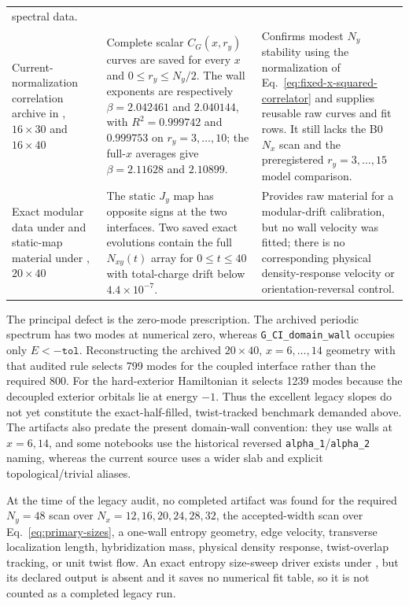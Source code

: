\documentclass[aps,prx,twocolumn,floatfix,nofootinbib,superscriptaddress,longbibliography]{revtex4-2}
\newcommand{\code}[1]{\texttt{#1}}
\begin{document}
\begin{table}[t]
\begin{tabularx}{\textwidth}{@{}L{0.80}L{1.05}L{1.15}@{}}
spectral data. \\
Current-normalization correlation archive in
,
$16\times30$ and $16\times40$
& Complete scalar $C_G(x,r_y)$ curves are saved for every $x$ and
$0\leq r_y\leq N_y/2$.  The wall exponents are respectively
$\beta=2.042461$ and $2.040144$, with $R^2=0.999742$ and $0.999753$ on
$r_y=3,\ldots,10$; the full-$x$ averages give $\beta=2.11628$ and $2.10899$.
& Confirms modest $N_y$ stability using the normalization of
Eq.~\eqref{eq:fixed-x-squared-correlator} and supplies reusable raw curves and fit rows.
It still lacks the B0 $N_x$ scan and the preregistered $r_y=3,\ldots,15$ model
comparison. \\
Exact modular data under  and
static-map material under ,
$20\times40$
& The static $J_y$ map has opposite signs at the two interfaces.  Two saved exact
evolutions contain the full $N_{xy}(t)$ array for $0\leq t\leq40$ with total-charge drift
below $4.4\times10^{-7}$.
& Provides raw material for a modular-drift calibration, but no wall velocity was fitted;
there is no corresponding physical density-response velocity or orientation-reversal
control. \\
\bottomrule
\end{tabularx}
\end{table}

The principal defect is the zero-mode prescription.  The archived periodic spectrum has
two modes at numerical zero, whereas \code{G\_CI\_domain\_wall} occupies only
$E<-\code{tol}$.  Reconstructing the archived $20\times40$, $x=6,\ldots,14$ geometry with
that audited rule selects 799 modes for the coupled interface rather than the required
800.  For the hard-exterior Hamiltonian it selects 1239 modes because the decoupled
exterior orbitals lie at energy $-1$.  Thus the excellent legacy slopes do not yet
constitute the exact-half-filled, twist-tracked benchmark demanded above.  The artifacts
also predate the present domain-wall convention: they use walls at $x=6,14$, and some
notebooks use the historical reversed \code{alpha\_1}/\code{alpha\_2} naming, whereas the
current source uses a wider slab and explicit topological/trivial aliases.

At the time of the legacy audit, no completed artifact was found for the required $N_y=48$ scan over
$N_x=12,16,20,24,28,32$, the accepted-width scan over Eq.~\eqref{eq:primary-sizes}, a
one-wall entropy geometry, edge velocity, transverse localization length, hybridization
mass, physical density response, twist-overlap tracking, or unit twist flow.  An exact
entropy size-sweep driver exists under , but its declared output is absent
and it saves no numerical fit table, so it is not counted as a completed legacy run.
\end{document}
